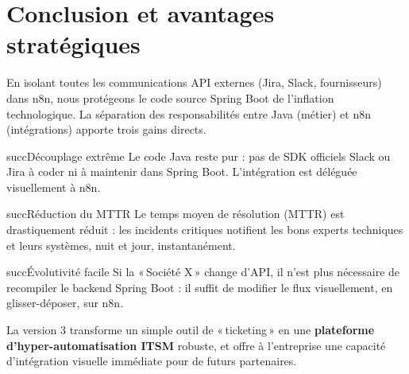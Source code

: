 \documentclass[10.5pt,a4paper]{article}
\begin{document}
\section{Conclusion et avantages stratégiques}
En isolant toutes les communications API externes (Jira, Slack, fournisseurs) dans n8n, nous protégeons le code source Spring Boot de l'inflation technologique. La séparation des responsabilités entre Java (métier) et n8n (intégrations) apporte trois gains directs.

\begin{callout}{succ}{Découplage extrême}
Le code Java reste pur : pas de SDK officiels Slack ou Jira à coder ni à maintenir dans Spring Boot. L'intégration est déléguée visuellement à n8n.
\end{callout}
\vspace{6pt}
\begin{callout}{succ}{Réduction du MTTR}
Le temps moyen de résolution (MTTR) est drastiquement réduit : les incidents critiques notifient les bons experts techniques et leurs systèmes, nuit et jour, instantanément.
\end{callout}
\vspace{6pt}
\begin{callout}{succ}{Évolutivité facile}
Si la «\,Société X\,» change d'API, il n'est plus nécessaire de recompiler le backend Spring Boot : il suffit de modifier le flux visuellement, en glisser-déposer, sur n8n.
\end{callout}

\vspace{10pt}
La version 3 transforme un simple outil de «\,ticketing\,» en une \textbf{plateforme d'hyper-automatisation ITSM} robuste, et offre à l'entreprise une capacité d'intégration visuelle immédiate pour de futurs partenaires.
\end{document}
